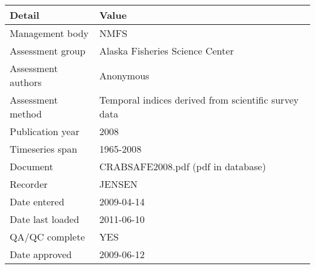 \begin{table}[htb]
\centering
\begin{tabular}{lp{7cm}}
\toprule
Detail & Value \\
\midrule
Management body    & NMFS                                                 \\
Assessment group   & Alaska Fisheries Science Center                      \\
Assessment authors & Anonymous                                            \\
Assessment method  & Temporal indices derived from scientific survey data \\
Publication year   & 2008                                                 \\
Timeseries span    & 1965-2008                                            \\
Document           & CRABSAFE2008.pdf (pdf in database)                   \\
Recorder           & JENSEN                                               \\
Date entered       & 2009-04-14                                           \\
Date last loaded   & 2011-06-10                                           \\
QA/QC complete     & YES                                                  \\
Date approved      & 2009-06-12                                           \\
\bottomrule
\end{tabular}
\label{tab:assessdet}
\end{table}

